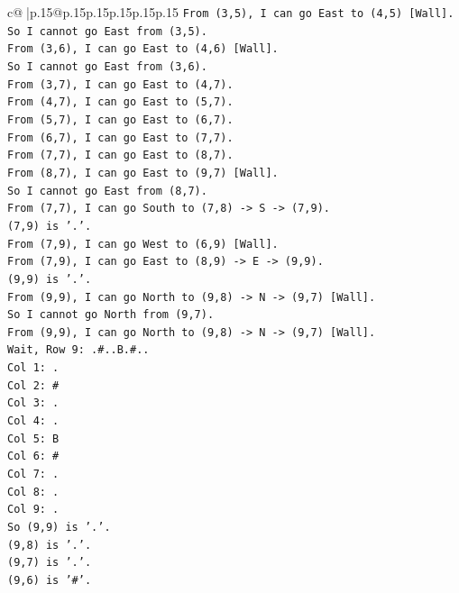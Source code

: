 \documentclass{article}
\begin{document}
{\begin{supertabular}{c@{$\;$}|p{.15\linewidth}@{}p{.15\linewidth}p{.15\linewidth}p{.15\linewidth}p{.15\linewidth}p{.15\linewidth}}
{{{\texttt{From (3,5), I can go East to (4,5) {[}Wall{]}.} \\
\texttt{So I cannot go East from (3,5).} \\
\texttt{From (3,6), I can go East to (4,6) {[}Wall{]}.} \\
\texttt{So I cannot go East from (3,6).} \\
\texttt{From (3,7), I can go East to (4,7).} \\
\texttt{From (4,7), I can go East to (5,7).} \\
\texttt{From (5,7), I can go East to (6,7).} \\
\texttt{From (6,7), I can go East to (7,7).} \\
\texttt{From (7,7), I can go East to (8,7).} \\
\texttt{From (8,7), I can go East to (9,7) {[}Wall{]}.} \\
\texttt{So I cannot go East from (8,7).} \\
\texttt{From (7,7), I can go South to (7,8) {-}> S {-}> (7,9).} \\
\texttt{(7,9) is '.'.} \\
\texttt{From (7,9), I can go West to (6,9) {[}Wall{]}.} \\
\texttt{From (7,9), I can go East to (8,9) {-}> E {-}> (9,9).} \\
\texttt{(9,9) is '.'.} \\
\texttt{From (9,9), I can go North to (9,8) {-}> N {-}> (9,7) {[}Wall{]}.} \\
\texttt{So I cannot go North from (9,7).} \\
\texttt{From (9,9), I can go North to (9,8) {-}> N {-}> (9,7) {[}Wall{]}.} \\
\texttt{Wait, Row 9: .\#..B.\#..} \\
\texttt{Col 1: .} \\
\texttt{Col 2: \#} \\
\texttt{Col 3: .} \\
\texttt{Col 4: .} \\
\texttt{Col 5: B} \\
\texttt{Col 6: \#} \\
\texttt{Col 7: .} \\
\texttt{Col 8: .} \\
\texttt{Col 9: .} \\
\texttt{So (9,9) is '.'.} \\
\texttt{(9,8) is '.'.} \\
\texttt{(9,7) is '.'.} \\
\texttt{(9,6) is '\#'.} \\
}}}
\end{supertabular}}
\end{document}
